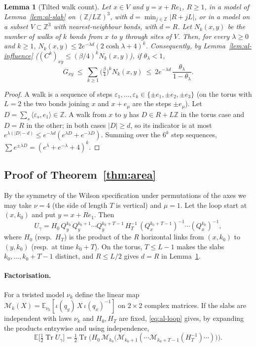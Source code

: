 \documentclass[11pt,a4paper]{article}
\theoremstyle{remark}
\theoremstyle{definition}
\theoremstyle{plain}
\newtheorem{allem}[althm]{Lemma}
\theoremstyle{remark}
\newcommand{\Z}{\mathbb{Z}}
\newcommand{\E}{\mathbb{E}}
\begin{document}
\begin{allem}[Tilted walk count]\label{lem:al-walks}
Let $x\in V$ and $y=x+Re_1$, $R\ge1$, in a model of Lemma~\ref{lem:al-slab} on $(\Z/L\Z)^3$, with $d=\min_{j\in\Z}|R+jL|$, or in a model on a subset $V\subset\Z^3$ with nearest-neighbour bonds, with $d=R$. Let $N_k(x,y)$ be the number of walks of $k$ bonds from $x$ to $y$ through sites of $V$. Then, for every $\lambda\ge0$ and $k\ge1$, $N_k(x,y)\le2e^{-\lambda d}(2\cosh\lambda+4)^k$. Consequently, by Lemma~\ref{lem:al-influence} ($(C^k)_{xy}\le(\beta/4)^kN_k(x,y)$), if $\theta_\lambda<1$,
\[
G_{xy}\ \le\ \sum_{k\ge1}\big(\tfrac\beta4\big)^kN_k(x,y)\ \le\ 2e^{-\lambda d}\,\frac{\theta_\lambda}{1-\theta_\lambda}.
\]
\end{allem}
\begin{proof}
A walk is a sequence of steps $\varepsilon_1,\dots,\varepsilon_k\in\{\pm e_1,\pm e_2,\pm e_3\}$ (on the torus with $L=2$ the two bonds joining $x$ and $x+e_\mu$ are the steps $\pm e_\mu$). Let $D=\sum_s\langle\varepsilon_s,e_1\rangle\in\Z$. A walk from $x$ to $y$ has $D\in R+L\Z$ in the torus case and $D=R$ in the other; in both cases $|D|\ge d$, so its indicator is at most $e^{\lambda(|D|-d)}\le e^{-\lambda d}(e^{\lambda D}+e^{-\lambda D})$. Summing over the $6^k$ step sequences, $\sum e^{\pm\lambda D}=(e^\lambda+e^{-\lambda}+4)^k$.
\end{proof}

\subsection{Proof of Theorem~\ref{thm:area}}\label{sec:areaproof}

By the symmetry of the Wilson specification under permutations of the axes we may take $\nu=4$ (the side of length $T$ is vertical) and $\mu=1$. Let the loop start at $(x,k_0)$ and put $y=x+Re_1$. Then
\begin{equation}\label{eq:al-loop}
U_\gamma=H_0\,Q^{k_0}_y\,Q^{k_0+1}_y\cdots Q^{k_0+T-1}_y\,H_T^{-1}\,(Q^{k_0+T-1}_x)^{-1}\cdots(Q^{k_0}_x)^{-1},
\end{equation}
where $H_0$ (resp.\ $H_T$) is the product of the $R$ horizontal links from $(x,k_0)$ to $(y,k_0)$ (resp.\ at time $k_0+T$). On the torus, $T\le L-1$ makes the slabs $k_0,\dots,k_0+T-1$ distinct, and $R\le L/2$ gives $d=R$ in Lemma~\ref{lem:al-walks}.

\paragraph{Factorisation.} For a twisted model $\nu_k$ define the linear map $\mathcal M_k(X)=\E_{\nu_k}[\iota(q_y)\,X\,\iota(q_x)^{-1}]$ on $2\times2$ complex matrices. If the slabs are independent with laws $\nu_k$ and $H_0,H_T$ are fixed, \eqref{eq:al-loop} gives, by expanding the products entrywise and using independence,
\begin{equation}\label{eq:al-factor}
\E\big[\tfrac12\operatorname{Tr}U_\gamma\big]=\tfrac12\operatorname{Tr}\Big(H_0\,\mathcal M_{k_0}\big(\mathcal M_{k_0+1}(\cdots\mathcal M_{k_0+T-1}(H_T^{-1})\cdots)\big)\Big).
\end{equation}
\end{document}
